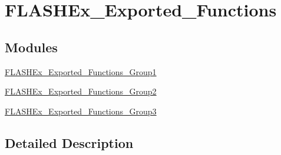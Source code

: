 \hypertarget{group___f_l_a_s_h_ex___exported___functions}{\section{F\-L\-A\-S\-H\-Ex\-\_\-\-Exported\-\_\-\-Functions}
\label{group___f_l_a_s_h_ex___exported___functions}
}
\subsection*{Modules}
\begin{DoxyCompactItemize}
\item 
\hyperlink{group___f_l_a_s_h_ex___exported___functions___group1}{F\-L\-A\-S\-H\-Ex\-\_\-\-Exported\-\_\-\-Functions\-\_\-\-Group1}
\item 
\hyperlink{group___f_l_a_s_h_ex___exported___functions___group2}{F\-L\-A\-S\-H\-Ex\-\_\-\-Exported\-\_\-\-Functions\-\_\-\-Group2}
\item 
\hyperlink{group___f_l_a_s_h_ex___exported___functions___group3}{F\-L\-A\-S\-H\-Ex\-\_\-\-Exported\-\_\-\-Functions\-\_\-\-Group3}
\end{DoxyCompactItemize}


\subsection{Detailed Description}
